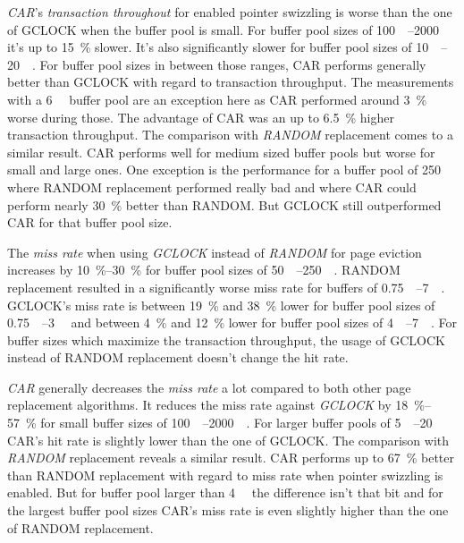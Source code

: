     \emph{CAR}'s \emph{transaction throughout} for enabled pointer swizzling is worse than the one of GCLOCK when the buffer pool is small. For buffer pool sizes of \SIrange{100}{2000}{\mebi\byte} it's up to \SI{15}{\percent} slower. It's also significantly slower for buffer pool sizes of \SIrange{10}{20}{\gibi\byte}. For buffer pool sizes in between those ranges, CAR performs generally better than GCLOCK with regard to transaction throughput. The measurements with a \SI{6}{\gibi\byte} buffer pool are an exception here as CAR performed around \SI{3}{\percent} worse during those. The advantage of CAR was an up to \SI{6.5}{\percent} higher transaction throughput. The comparison with \emph{RANDOM} replacement comes to a similar result. CAR performs well for medium sized buffer pools but worse for small and large ones. One exception is the performance for a buffer pool of \SI{250}{\mebi\byte} where RANDOM replacement performed really bad and where CAR could perform nearly \SI{30}{\percent} better than RANDOM. But GCLOCK still outperformed CAR for that buffer pool size.

    The \emph{miss rate} when using \emph{GCLOCK} instead of \emph{RANDOM} for page eviction increases by \SIrange{10}{30}{\percent} for buffer pool sizes of \SIrange{50}{250}{\mebi\byte}. RANDOM replacement resulted in a significantly worse miss rate for buffers of \SIrange{0.75}{7}{\gibi\byte}. GCLOCK's miss rate is between \SI{19}{\percent} and \SI{38}{\percent} lower for buffer pool sizes of \SIrange{0.75}{3}{\gibi\byte} and between \SI{4}{\percent} and \SI{12}{\percent} lower for buffer pool sizes of \SIrange{4}{7}{\gibi\byte}. For buffer sizes which maximize the transaction throughput, the usage of GCLOCK instead of RANDOM replacement doesn't change the hit rate.

    \emph{CAR} generally decreases the \emph{miss rate} a lot compared to both other page replacement algorithms. It reduces the miss rate against \emph{GCLOCK} by \SIrange{18}{57}{\percent} for small buffer sizes of \SIrange{100}{2000}{\mebi\byte}. For larger buffer pools of \SIrange{5}{20}{\gibi\byte} CAR's hit rate is slightly lower than the one of GCLOCK. The comparison with \emph{RANDOM} replacement reveals a similar result. CAR performs up to \SI{67}{\percent} better than RANDOM replacement with regard to miss rate when pointer swizzling is enabled. But for buffer pool larger than \SI{4}{\gibi\byte} the difference isn't that bit and for the largest buffer pool sizes CAR's miss rate is even slightly higher than the one of RANDOM replacement.


